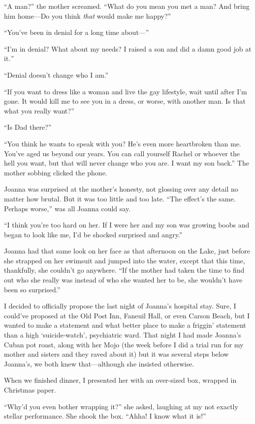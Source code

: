 ``A man?'' the mother screamed. ``What do you mean you met a man? And
bring him home---Do you think \emph{that} would make me happy?''

``You've been in denial for a long time about---''

``I'm in denial? What about my needs? I raised a son and did a damn good
job at it\emph{.''}

``Denial doesn't change who I am.''

``If you want to dress like a woman and live the gay lifestyle, wait
until after I'm gone. It would kill me to see you in a dress, or worse,
with another man. Is that what you really want?''

``Is Dad there?''

``You think he wants to speak with you? He's even more heartbroken than
me. You've aged us beyond our years. You can call yourself Rachel or
whoever the hell you want, but that will never change who you are. I
want my son back.'' The mother sobbing clicked the phone.

Joanna was surprised at the mother's honesty, not glossing over any
detail no matter how brutal. But it was too little and too late. ``The
effect's the same. Perhaps worse,'' was all Joanna could say.

``I think you're too hard on her. If I were her and my son was growing
boobs and began to look like me, I'd be shocked surprised and angry.''

Joanna had that same look on her face as that afternoon on the Lake,
just before she strapped on her swimsuit and jumped into the water,
except that this time, thankfully, she couldn't go anywhere. ``If the
mother had taken the time to find out who she really was instead of who
she wanted her to be, she wouldn't have been so surprised.''

I decided to officially propose the last night of Joanna's hospital
stay. Sure, I could've proposed at the Old Post Inn, Faneuil Hall, or
even Carson Beach, but I wanted to make a statement and what better
place to make a friggin' statement than a high `suicide-watch',
psychiatric ward. That night I had made Joanna's Cuban pot roast, along
with her Mojo (the week before I did a trial run for my mother and
sisters and they raved about it) but it was several steps below
Joanna's, we both knew that---although she insisted otherwise.

When we finished dinner, I presented her with an over-sized box, wrapped
in Christmas paper.

``Why'd you even bother wrapping it?'' she asked, laughing at my not
exactly stellar performance. She shook the box. ``Ahha! I know what it
is!''

